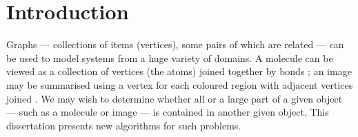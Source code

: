 \chapter{Introduction}
\label{c:intro}

\newcommand{\ChapterRef}[1] {\Cref{#1}: \nameref{#1}}

\newcommand{\FourQueens}[2] {
  \begin{tikzpicture}[scale=0.6, every node/.style={black,scale=0.9}]
    \newcommand*{\xMin}{0}%
    \newcommand*{\xMax}{3}%
    \newcommand*{\yMin}{0}%
    \newcommand*{\yMax}{3}%
    \foreach \i / \label in {0/a,1/b,2/c,3/d} {
        \draw [] node at (\i+.5,\yMin-.3) {$\label$};
    }
    \foreach \i / \label in {0/1,1/2,2/3,3/4} {
        \draw [] node at (\xMin-.3,\i+.5) {$\label$};
    }

    \foreach \y in {0,2}{
        \foreach \x in {0,2}{
            \fill[black!8] (\x,\y) rectangle (1+\x,1+\y) rectangle (2+\x,2+\y);}}
    \draw [step=1.0] (0,0) grid (4,4);
    \foreach \x/\y/\m in {#2}
        \draw [] node at (\x,\y) {\m};
    \node[draw,circle,inner sep=1mm] at (-1.4,3.5) {#1};
  \end{tikzpicture}
}

\newcommand{\MCSDomains}[2] {
  \begin{tikzpicture}[scale=0.6, every node/.style={black,scale=0.9}]
    \newcommand*{\xMin}{0}%
    \newcommand*{\xMax}{5}%
    \newcommand*{\yMin}{0}%
    \newcommand*{\yMax}{4}%
    \foreach \i / \label in {0/a,1/b,2/c,3/d,4/e,5/f} {
        \draw [] node at (\i+.5,\yMax+1.4) {$\label$};
    }
    \foreach \i / \label in {4/1,3/2,2/3,1/4,0/5} {
        \draw [] node at (\xMin-.3,\i+.5) {$\label$};
    }

    \draw [step=1.0] (0,0) grid (6,5);
    \foreach \x/\y/\m in {#2}
        \draw [] node at (\x,\y) {\m};
    \node[draw,circle,inner sep=1mm] at (-1.4,3.5) {#1};
  \end{tikzpicture}
}

Graphs --- collections of items (vertices), some pairs of which
are related --- can be used to model
systems from a huge variety of domains.  A molecule can be viewed as a collection
of vertices (the atoms) joined together by bonds
\citep{sussenguth1965graph}; 
an image may be summarised using a vertex for each coloured region
with adjacent vertices joined \citep{DBLP:conf/icip/OlatunbosunDE96}.
We may wish to determine whether all or a large
part of a given object --- such as a molecule or image --- is contained
in another given object.  This dissertation presents new algorithms
for such problems.


